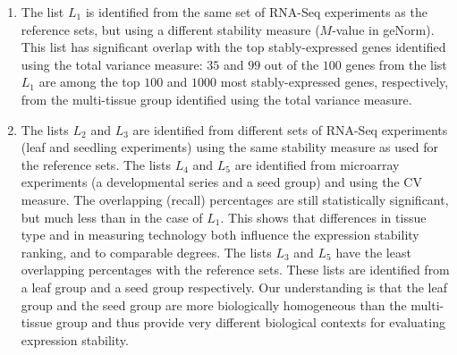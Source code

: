 \documentclass[11pt, a4paper]{article}
\begin{document}
\begin{enumerate}
    \item
	The list $L_1$ is identified from the same set of RNA-Seq experiments as the
	reference sets, but using a different stability measure ($M$-value in
	geNorm). This list has significant overlap with the top
	stably-expressed genes identified using the total variance measure:
	$35$ and $99$ out of the $100$ genes from the list $L_1$ are among the
	top $100$ and $1000$ most stably-expressed genes, respectively, from the
	multi-tissue group identified using the total variance measure. 
    \item
	The lists $L_2$ and $L_3$ are identified from different sets of
	RNA-Seq experiments (leaf and seedling experiments) using the same
	stability measure as used for the reference sets. The lists $L_4$ and $L_5$ are
	identified from microarray experiments (a developmental series and a
	seed group) and using the CV measure. The overlapping (recall)
	percentages are still statistically significant, but much less than in
	the case of $L_1$.  This shows that differences in tissue type and in
	measuring technology both influence the expression stability ranking,
	and to comparable degrees. The lists $L_3$ and $L_5$ have the least
	overlapping percentages with the reference sets. These lists are
	identified from a leaf group and a seed group respectively.
	Our understanding is that the leaf group and the seed group are more
	biologically homogeneous than the multi-tissue group and thus provide
	very different biological contexts for evaluating expression stability.
\end{enumerate}


\end{document}
